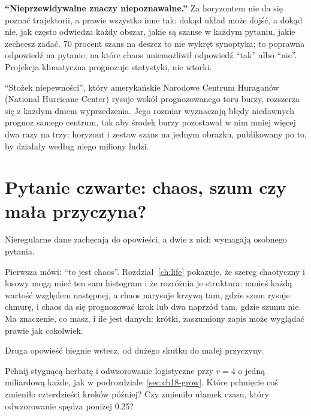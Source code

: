 \begin{trapbox}
\textbf{\enquote{Nieprzewidywalne znaczy niepoznawalne.}} Za horyzontem nie
da się poznać trajektorii, a prawie wszystko inne tak: dokąd układ może
dojść, a dokąd nie, jak często odwiedza każdy obszar, jakie są szanse w
każdym pytaniu, jakie zechcesz zadać. 70 procent szans na deszcz to nie
wykręt synoptyka; to poprawna odpowiedź na pytanie, na które chaos
uniemożliwił odpowiedź \enquote{tak} albo \enquote{nie}. Projekcja
klimatyczna prognozuje statystyki, nie wtorki.
\end{trapbox}

\begin{worldbox}
\enquote{Stożek niepewności}, który amerykańskie Narodowe Centrum
Huraganów (National Hurricane Center) rysuje wokół prognozowanego toru
burzy, rozszerza się z każdym dniem wyprzedzenia. Jego rozmiar wyznaczają
błędy niedawnych prognoz samego centrum, tak aby środek burzy pozostawał w
nim mniej więcej dwa razy na trzy: horyzont i zestaw szans na jednym
obrazku, publikowany po to, by działały według niego miliony ludzi.
\end{worldbox}

\section{Pytanie czwarte: chaos, szum czy mała przyczyna?}
\label{sec:ch18-noise}

\noindent
Nieregularne dane zachęcają do opowieści, a dwie z nich wymagają osobnego
pytania.

Pierwsza mówi: \enquote{to jest chaos}. Rozdział~\ref{ch:life} pokazuje, że
szereg chaotyczny i losowy mogą mieć ten sam histogram i że rozróżnia je
struktura: nanieś każdą wartość względem następnej, a chaos narysuje
krzywą tam, gdzie szum rysuje chmurę, i chaos da się prognozować krok lub
dwa naprzód tam, gdzie szumu nie. Ma znaczenie, co masz, i ile jest danych:
krótki, zaszumiony zapis może wyglądać prawie jak cokolwiek.

Druga opowieść biegnie wstecz, od dużego skutku do małej przyczyny.

\begin{think}
Pchnij stygnącą herbatę i odwzorowanie logistyczne przy $r = 4$ o jedną
miliardową każde, jak w podrozdziale~\ref{sec:ch18-grow}. Które pchnięcie
coś zmieniło czterdzieści kroków później? Czy zmieniło ułamek czasu, który
odwzorowanie spędza poniżej \num{0.25}?
\end{think}

